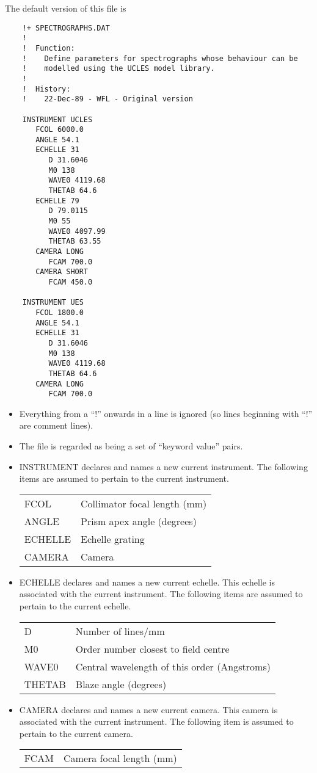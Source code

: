 The default version of this file is
\begin{verbatim}
    !+ SPECTROGRAPHS.DAT
    !
    !  Function:
    !    Define parameters for spectrographs whose behaviour can be
    !    modelled using the UCLES model library.
    !
    !  History:
    !    22-Dec-89 - WFL - Original version

    INSTRUMENT UCLES
       FCOL 6000.0
       ANGLE 54.1
       ECHELLE 31
          D 31.6046
          M0 138
          WAVE0 4119.68
          THETAB 64.6
       ECHELLE 79
          D 79.0115
          M0 55
          WAVE0 4097.99
          THETAB 63.55
       CAMERA LONG
          FCAM 700.0
       CAMERA SHORT
          FCAM 450.0

    INSTRUMENT UES
       FCOL 1800.0
       ANGLE 54.1
       ECHELLE 31
          D 31.6046
          M0 138
          WAVE0 4119.68
          THETAB 64.6
       CAMERA LONG
          FCAM 700.0
\end{verbatim}
\begin{itemize}
\item Everything from a ``!'' onwards in a line is ignored (so lines beginning
with ``!'' are comment lines).
\item The file is regarded as being a set of ``keyword value'' pairs.
\item INSTRUMENT declares and names a new current instrument. The following
items are assumed to pertain to the current instrument. \\
\begin{tabular}{ll}
FCOL	& Collimator focal length (mm) \\
ANGLE	& Prism apex angle (degrees) \\
ECHELLE	& Echelle grating \\
CAMERA	& Camera
\end{tabular}
\item ECHELLE declares and names a new current echelle. This echelle is
associated with the current instrument. The following items are assumed to
pertain to the current echelle. \\
\begin{tabular}{ll}
D	& Number of lines/mm \\
M0	& Order number closest to field centre \\
WAVE0	& Central wavelength of this order (Angstroms) \\
THETAB	& Blaze angle (degrees)
\end{tabular}
\item CAMERA declares and names a new current camera. This camera is associated
with the current instrument. The following item is assumed to pertain to the
current camera. \\
\begin{tabular}{ll}
FCAM	& Camera focal length (mm)
\end{tabular}
\end{itemize}

